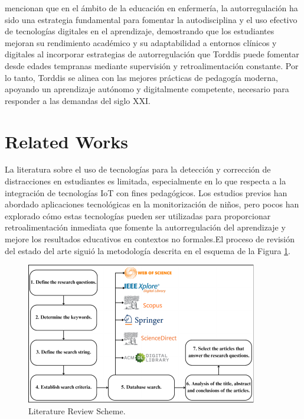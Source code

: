 \documentclass[a4paper,fleqn]{cas-sc}
\begin{document}
	\cite{Coffman2024Developing} mencionan que en el ámbito de la educación en enfermería, la autorregulación ha sido una estrategia fundamental para fomentar la autodisciplina y el uso efectivo de tecnologías digitales en el aprendizaje, demostrando que los estudiantes mejoran su rendimiento académico y su adaptabilidad a entornos clínicos y digitales al incorporar estrategias de autorregulación que Torddis puede fomentar desde edades tempranas mediante supervisión y retroalimentación constante. Por lo tanto, Torddis se alinea con las mejores prácticas de pedagogía moderna, apoyando un aprendizaje autónomo y digitalmente competente, necesario para responder a las demandas del siglo XXI.
	
	\section{Related Works}
	\label{seccion:Tres}
	La literatura sobre el uso de tecnologías para la detección y corrección de distracciones en estudiantes es limitada, especialmente en lo que respecta a la integración de tecnologías IoT con fines pedagógicos. Los estudios previos han abordado aplicaciones tecnológicas en la monitorización de niños, pero pocos han explorado cómo estas tecnologías pueden ser utilizadas para proporcionar retroalimentación inmediata que fomente la autorregulación del aprendizaje y mejore los resultados educativos en contextos no formales.El proceso de revisión del estado del arte siguió la metodología descrita en el esquema de la Figura \ref{fig:LRS}.
	
	\begin{figure}[h]
		\includegraphics[width=\textwidth]{figs/Figure_1}
		\caption{Literature Review Scheme.}
		\label{fig:LRS}
	\end{figure}   
	
\end{document}

